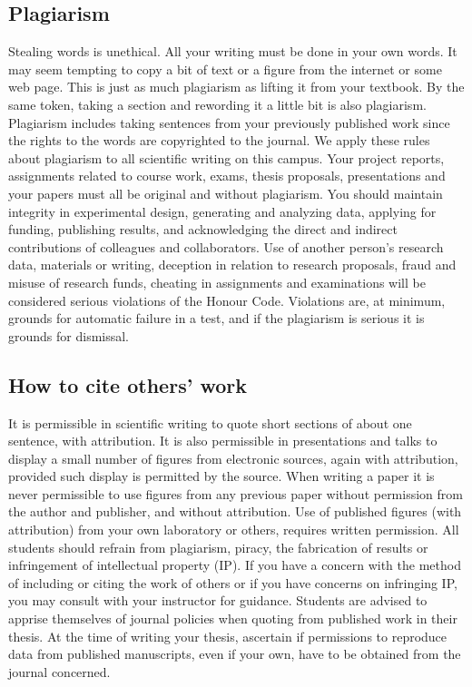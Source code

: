 \documentclass[a4paper,10pt]{article}
\begin{document}
\subsection{Plagiarism} Stealing words is unethical. All your writing must be
done in your own words.  It may seem tempting to copy a bit of text or a figure
from the internet or some web page.  This is just as much plagiarism as lifting
it from your textbook. By the same token, taking a section and rewording it a
little bit is also plagiarism. Plagiarism includes taking sentences from your
previously published work since the rights to the words are copyrighted to the
journal. We apply these rules about plagiarism to all scientific writing on this
campus. Your project reports, assignments related to course work, exams, thesis
proposals, presentations and your papers must all be original and without
plagiarism. You should maintain integrity in experimental design, generating and
analyzing data, applying for funding, publishing results, and acknowledging the
direct and indirect contributions of colleagues and
collaborators. Use of another person’s research data, materials or writing, deception in
relation to research proposals, fraud and misuse of research funds, cheating in assignments
and examinations will be considered serious violations of the Honour Code. Violations are,
at minimum, grounds for automatic failure in a test, and if the plagiarism is serious it is
grounds for dismissal.

\subsection{How to cite others' work}
It is permissible in scientific writing to quote short sections of
about one sentence, with attribution. It is also permissible in presentations and talks to
display a small number of figures from electronic sources, again with attribution, provided
such display is permitted by the source. When writing a paper it is never permissible to use
figures from any previous paper without permission from the author and publisher, and
without attribution. Use of published figures (with attribution) from your own laboratory or
others, requires written permission. All students should refrain from plagiarism, piracy, the
fabrication of results or infringement of intellectual property (IP). If you have a concern
with the method of including or citing the work of others or if you have concerns on
infringing IP, you may consult with your instructor for guidance. Students are advised to
apprise themselves of journal policies when quoting from published work in their thesis. At
the time of writing your thesis, ascertain if permissions to reproduce data from published
manuscripts, even if your own, have to be obtained from the journal concerned.
\end{document}
